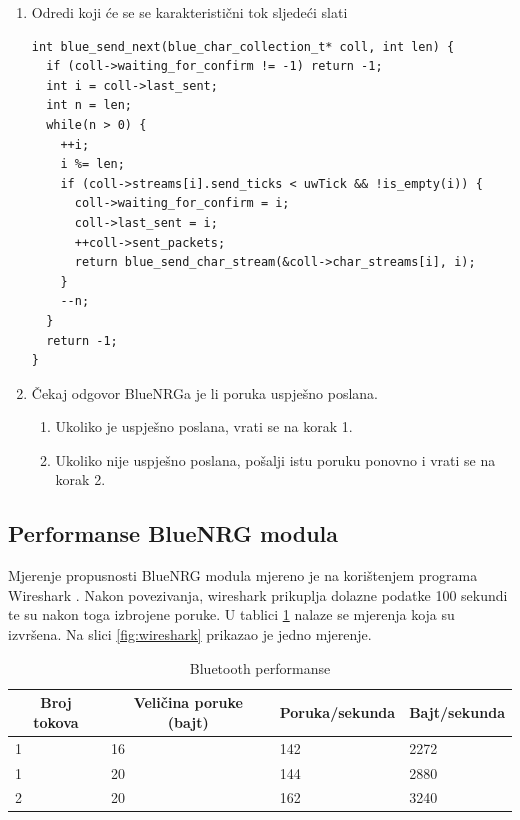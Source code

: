 \documentclass[times, utf8, diplomski]{diplomski}
\begin{document}
\begin{enumerate}
  \item Odredi koji će se se karakteristični tok sljedeći slati
\begin{lstlisting}[caption = {Procedura za odabir karakterističnog toka koji će sljedeći biti poslan}]
int blue_send_next(blue_char_collection_t* coll, int len) {
  if (coll->waiting_for_confirm != -1) return -1;
  int i = coll->last_sent;
  int n = len;
  while(n > 0) {
    ++i;
    i %= len;
    if (coll->streams[i].send_ticks < uwTick && !is_empty(i)) {
      coll->waiting_for_confirm = i;
      coll->last_sent = i;
      ++coll->sent_packets;
      return blue_send_char_stream(&coll->char_streams[i], i);
    }
    --n;
  }
  return -1;
}
\end{lstlisting}
  \item Čekaj odgovor BlueNRGa je li poruka uspješno poslana.
    \begin{enumerate}
      \item Ukoliko je uspješno poslana, vrati se na korak 1.
      \item Ukoliko nije uspješno poslana, pošalji istu poruku ponovno i vrati se na korak 2.
    \end{enumerate}
\end{enumerate}


\subsection{Performanse BlueNRG modula}

Mjerenje propusnosti BlueNRG modula mjereno je na korištenjem programa Wireshark \cite{wireshark}. Nakon povezivanja, wireshark prikuplja dolazne podatke 100 sekundi te su nakon toga izbrojene poruke. U tablici \ref{perftable} nalaze se mjerenja koja su izvršena. Na slici \ref{fig:wireshark} prikazao je jedno mjerenje.

\begin{table}[H]
  \begin{center}
    \begin{tabular}[c]{l|l|l|l}
      \hline
      \multicolumn{1}{c|}{\textbf{Broj tokova}} &
      \multicolumn{1}{c}{\textbf{Veličina poruke (bajt)}} &
      \multicolumn{1}{c}{\textbf{Poruka/sekunda}} &
      \multicolumn{1}{c}{\textbf{Bajt/sekunda}} \\
      \hline
      1 & 16 & 142 & 2272 \\
      1 & 20 & 144 & 2880 \\
      2 & 20 & 162 & 3240 \\
      \hline
    \end{tabular}
  \caption{Bluetooth performanse}
  \label{perftable}
  \end{center}
\end{table}
\end{document}
